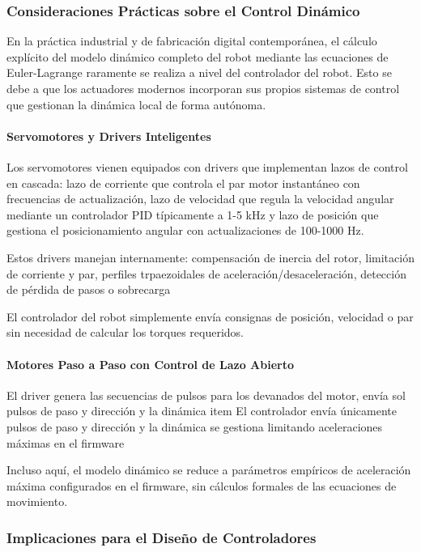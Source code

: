 \subsubsection{Consideraciones Prácticas sobre el Control Dinámico}

En la práctica industrial y de fabricación digital contemporánea, el cálculo explícito del modelo dinámico completo del robot mediante las ecuaciones de Euler-Lagrange raramente se realiza a nivel del controlador del robot. Esto se debe a que los actuadores modernos incorporan sus propios sistemas de control que gestionan la dinámica local de forma autónoma.

\paragraph{Servomotores y Drivers Inteligentes}

Los servomotores vienen equipados con drivers que implementan lazos de control en cascada: lazo de corriente que controla el par motor instantáneo con frecuencias de actualización, lazo de velocidad que regula la velocidad angular mediante un controlador PID típicamente a 1-5 kHz y lazo de posición que gestiona el posicionamiento angular con actualizaciones de 100-1000 Hz.

Estos drivers manejan internamente: compensación de inercia del rotor, limitación de corriente y par, perfiles trpaezoidales de aceleración/desaceleración, detección de pérdida de pasos o sobrecarga

El controlador del robot simplemente envía consignas de posición, velocidad o par sin necesidad de calcular los torques requeridos.

\paragraph{Motores Paso a Paso con Control de Lazo Abierto}

El driver genera las secuencias de pulsos para los devanados del motor, envía sol pulsos de paso y dirección y la dinámica item El controlador envía únicamente pulsos de paso y dirección y la dinámica se gestiona limitando aceleraciones máximas en el firmware

Incluso aquí, el modelo dinámico se reduce a parámetros empíricos de aceleración máxima configurados en el firmware, sin cálculos formales de las ecuaciones de movimiento.

\subsubsection{Implicaciones para el Diseño de Controladores}

